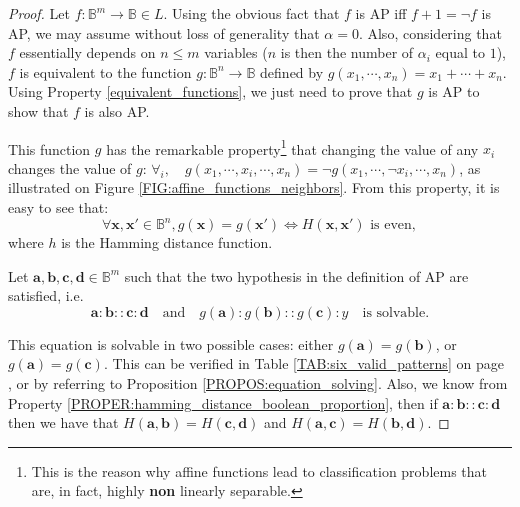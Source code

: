 \begin{proof}
  Let $f \colon \mathbb{B}^m \to \mathbb{B} \in L$. Using the obvious fact that
  $f$ is AP  iff $f + 1 = \neg f$ is AP, we may assume without loss of
  generality that $\alpha = 0$. Also, considering that $f$ essentially depends
  on $n \leq m$ variables ($n$ is then the number of $\alpha_i$ equal to $1$),
  $f$ is equivalent to the function $g \colon \mathbb{B}^n \to \mathbb{B}$
  defined by $g(x_1, \cdots, x_n) = x_1 +  \cdots + x_n$. Using Property
  \ref{equivalent_functions}, we just need to prove that $g$ is AP to show that
  $f$ is also AP.

  This function $g$ has the remarkable property\footnote{This is the reason why
  affine functions lead to classification problems that are, in fact, highly
  \textbf{non} linearly separable.} that changing the value of any $x_i$
  changes the value of $g$: $\forall _i, \quad g(x_1, \cdots, x_i, \cdots, x_n)
  = \neg g(x_1, \cdots, \neg x_i, \cdots, x_n)$, as illustrated on Figure
  \ref{FIG:affine_functions_neighbors}. From this property, it is easy to see
  that:
  $$\forall \mathbf{x}, \mathbf{x}' \in \mathbb{B}^n, g(\mathbf{x}) =
  g(\mathbf{x}') \iff H(\mathbf{x}, \mathbf{x}') \text{ is even},$$
  where $h$ is the Hamming distance function.

  Let $\mathbf{a}, \mathbf{b}, \mathbf{c}, \mathbf{d} \in \mathbb{B}^m$  such
  that the two hypothesis in the definition of AP are satisfied, i.e.
  $$
  \mathbf{a} : \mathbf{b} :: \mathbf{c} : \mathbf{d}\quad \text{and}\quad
  g(\mathbf{a}) : g(\mathbf{b}) :: g(\mathbf{c}) : y\quad  \text{is  solvable}.
  $$

  This equation is solvable in two possible cases: either $g(\mathbf{a}) =
  g(\mathbf{b})$, or $g(\mathbf{a}) = g(\mathbf{c})$. This can be verified in
  Table \ref{TAB:six_valid_patterns} on page \pageref{TAB:six_valid_patterns},
  or by referring to Proposition \ref{PROPOS:equation_solving}.
  Also, we know from Property \ref{PROPER:hamming_distance_boolean_proportion},
  then if $\mathbf{a} : \mathbf{b} :: \mathbf{c} : \mathbf{d}$ then we have
  that $H(\mathbf{a}, \mathbf{b}) = H(\mathbf{c}, \mathbf{d})$ and
  $H(\mathbf{a}, \mathbf{c}) = H(\mathbf{b}, \mathbf{d})$.


\end{proof}
